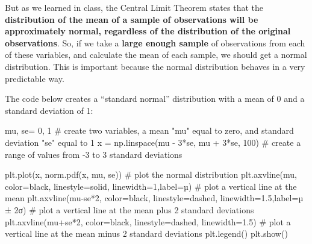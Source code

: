 \documentclass[
  letterpaper,
  DIV=11,
  numbers=noendperiod]{scrreprt}
\newenvironment{Shaded}{\begin{snugshade}}{\end{snugshade}}
\newcommand{\CommentTok}[1]{\textcolor[rgb]{0.37,0.37,0.37}{#1}}
\newcommand{\DecValTok}[1]{\textcolor[rgb]{0.68,0.00,0.00}{#1}}
\newcommand{\FloatTok}[1]{\textcolor[rgb]{0.68,0.00,0.00}{#1}}
\newcommand{\NormalTok}[1]{\textcolor[rgb]{0.00,0.23,0.31}{#1}}
\newcommand{\OperatorTok}[1]{\textcolor[rgb]{0.37,0.37,0.37}{#1}}
\newcommand{\StringTok}[1]{\textcolor[rgb]{0.13,0.47,0.30}{#1}}
\begin{document}
But as we learned in class, the Central Limit Theorem states that the
\textbf{distribution of the mean of a sample of observations will be
approximately normal, regardless of the distribution of the original
observations}. So, if we take a \textbf{large enough sample} of
observations from each of these variables, and calculate the mean of
each sample, we should get a normal distribution. This is important
because the normal distribution behaves in a very predictable way.

The code below creates a ``standard normal'' distribution with a mean of
0 and a standard deviation of 1:

\begin{Shaded}
\begin{Highlighting}[]
\NormalTok{mu, se}\OperatorTok{=} \DecValTok{0}\NormalTok{, }\DecValTok{1} \CommentTok{\# create two variables, a mean "mu" equal to zero, and standard deviation "se" equal to 1}
\NormalTok{x }\OperatorTok{=}\NormalTok{ np.linspace(mu }\OperatorTok{{-}} \DecValTok{3}\OperatorTok{*}\NormalTok{se, mu }\OperatorTok{+} \DecValTok{3}\OperatorTok{*}\NormalTok{se, }\DecValTok{100}\NormalTok{) }\CommentTok{\# create a range of values from {-}3 to 3 standard deviations}

\NormalTok{plt.plot(x, norm.pdf(x, mu, se)) }\CommentTok{\# plot the normal distribution}
\NormalTok{plt.axvline(mu, color}\OperatorTok{=}\StringTok{\textquotesingle{}black\textquotesingle{}}\NormalTok{, linestyle}\OperatorTok{=}\StringTok{\textquotesingle{}solid\textquotesingle{}}\NormalTok{, linewidth}\OperatorTok{=}\DecValTok{1}\NormalTok{,label}\OperatorTok{=}\StringTok{\textquotesingle{}µ\textquotesingle{}}\NormalTok{)  }\CommentTok{\# plot a vertical line at the mean}
\NormalTok{plt.axvline(mu}\OperatorTok{{-}}\NormalTok{se}\OperatorTok{*}\DecValTok{2}\NormalTok{, color}\OperatorTok{=}\StringTok{\textquotesingle{}black\textquotesingle{}}\NormalTok{, linestyle}\OperatorTok{=}\StringTok{\textquotesingle{}dashed\textquotesingle{}}\NormalTok{, linewidth}\OperatorTok{=}\FloatTok{1.5}\NormalTok{,label}\OperatorTok{=}\StringTok{\textquotesingle{}µ ± 2σ\textquotesingle{}}\NormalTok{) }\CommentTok{\# plot a vertical line at the mean plus 2 standard deviations}
\NormalTok{plt.axvline(mu}\OperatorTok{+}\NormalTok{se}\OperatorTok{*}\DecValTok{2}\NormalTok{, color}\OperatorTok{=}\StringTok{\textquotesingle{}black\textquotesingle{}}\NormalTok{, linestyle}\OperatorTok{=}\StringTok{\textquotesingle{}dashed\textquotesingle{}}\NormalTok{, linewidth}\OperatorTok{=}\FloatTok{1.5}\NormalTok{)  }\CommentTok{\# plot a vertical line at the mean minus 2 standard deviations}
\NormalTok{plt.legend()}
\NormalTok{plt.show()}
\end{Highlighting}
\end{Shaded}
\end{document}
